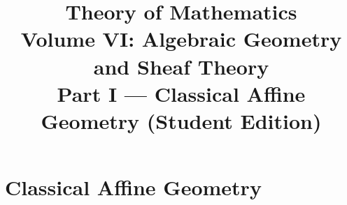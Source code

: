 \documentclass[11pt,a4paper,oneside,openany]{book}
\title{Theory of Mathematics\\[0.5em]\Large Volume VI: Algebraic Geometry and Sheaf Theory\\[0.4em]\normalsize Part I --- Classical Affine Geometry (Student Edition)}
\author{}\date{}
\begin{document}
\maketitle\clearpage
\frontmatter\tableofcontents
\mainmatter
\part{Classical Affine Geometry}





\end{document}
